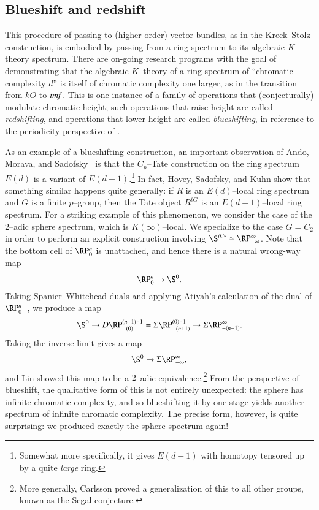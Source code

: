 \subsection*{Blueshift and redshift}

This procedure of passing to (higher-order) vector bundles, as in the Kreck--Stolz construction, is embodied by passing from a ring spectrum to its algebraic $K$--theory spectrum.  There are on-going research programs with the goal of demonstrating that the algebraic $K$--theory of a ring spectrum of ``chromatic complexity $d$'' is itself of chromatic complexity one larger, as in the transition from $kO$ to $\mathit{tmf}$.  This is one instance of a family of operations that (conjecturally) modulate chromatic height; such operations that raise height are called \textit{redshifting}, and operations that lower height are called \textit{blueshifting}, in reference to the periodicity perspective of .

As an example of a blueshifting construction, an important observation of Ando, Morava, and Sadofsky~\cite{AMS} is that the $C_p$--Tate construction on the ring spectrum $E(d)$ is a variant of $E(d-1)$.\footnote{Somewhat more specifically, it gives $E(d-1)$ with homotopy tensored up by a quite \emph{large} ring.}  In fact, Hovey, Sadofsky, and Kuhn show that something similar happens quite generally: if $R$ is an $E(d)$--local ring spectrum and $G$ is a finite $p$--group, then the Tate object $R^{tG}$ is an $E(d-1)$--local ring spectrum.  For a striking example of this phenomenon, we consider the case of the $2$--adic sphere spectrum, which is $K(\infty)$--local.  We specialize to the case $G = C_2$ in order to perform an explicit construction involving $\S^{tC_2} \simeq \RP^\infty_{-\infty}$.  Note that the bottom cell of $\RP^n_0$ is unattached, and hence there is a natural wrong-way map \[\RP^n_0 \to \S^0.\]  Taking Spanier--Whitehead duals and applying Atiyah's calculation of the dual of $\RP^n_0$~\cite{Atiyah}, we produce a map \[\S^0 \to D \RP^{(n+1)-1}_{-(0)} = \Susp \RP^{(0)-1}_{-(n+1)} \to \Susp \RP^\infty_{-(n+1)}.\]  Taking the inverse limit gives a map \[\S^0 \to \Susp \RP^\infty_{-\infty},\] and Lin showed this map to be a $2$--adic equivalence.\footnote{More generally, Carlsson proved a generalization of this to all other groups, known as the Segal conjecture.}  From the perspective of blueshift, the qualitative form of this is not entirely unexpected: the sphere has infinite chromatic complexity, and so blueshifting it by one stage yields another spectrum of infinite chromatic complexity.  The precise form, however, is quite surprising: we produced exactly the sphere spectrum again!

